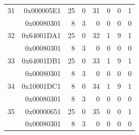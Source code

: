 \begin{longtable}{r r r r r r r r}
31 & 0x000005E1 & 25 & 0 & 31 & 0 & 0 & 1 \\
  & 0x00080301 & 8 & 3 & 0 & 0 & 0 & 0 \\
32 & 0x64001DA1 & 25 & 0 & 32 & 1 & 9 & 1 \\
  & 0x00080301 & 8 & 3 & 0 & 0 & 0 & 0 \\
33 & 0x64001DB1 & 25 & 0 & 33 & 1 & 9 & 1 \\
  & 0x00080301 & 8 & 3 & 0 & 0 & 0 & 0 \\
34 & 0x10001DC1 & 8 & 0 & 34 & 1 & 9 & 1 \\
  & 0x00080301 & 8 & 3 & 0 & 0 & 0 & 0 \\
35 & 0x00000651 & 25 & 0 & 35 & 0 & 0 & 1 \\
  & 0x00080301 & 8 & 3 & 0 & 0 & 0 & 0 \\


\end{longtable}
